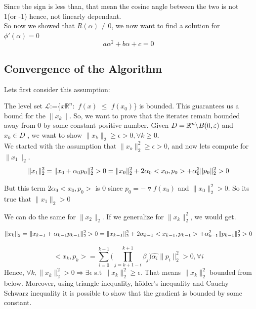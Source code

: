 \documentclass{article}
\numberwithin{equation}{section}
\begin{document}
Since the sign is less than, that mean the cosine angle between the two is not 1(or -1) hence, not linearly dependant.
\\
So now we showed that $R(\alpha) \neq 0 $, we now want to find a solution for $\phi ' (\alpha) = 0$ \\
 \begin{equation}
 a\alpha^2 + b\alpha + c = 0
\end{equation}
\subsection{Convergence of the Algorithm}

Lets first consider this assumption:

The level set $\mathcal{L}$:=\{$x$\in $\mathbb{R}^n:$ $f(x)$ $\leq$ $f(x_0)$\} is bounded. This guarantees us a bound for the $\|x_k\|$. So, we want to  prove that the iterates remain bounded away from 0 by some constant positive number. Given $D = \mathbb{R}^n \char`\\  B(0,\varepsilon)$ and $x_k \in D$ , we want to show $\|x_k\|_2 \geq \epsilon > 0, \forall k \geq 0$. \\

We started with the assumption that $\|x_o\|_2^2 \geq \epsilon > 0$, and now lets compute for $\|x_1\|_2$.
\begin{equation*}
\|x_1\|_2^2 =  \|x_0 + \alpha _0 p_0\|_2^2 > 0 \\
   = \|x_0\|_2^2 +2\alpha_0 <x_0,p_0>+ \alpha_0^2\|p_0\|_2^2   > 0 \\
\end{equation*}

But this term  $2\alpha_0 <x_0,p_0>$ is 0 since $p_0 = -\triangledown f(x_0)$  and $\|x_0\|_2^2 > 0$. So its true that $\|x_1\|_2 > 0$

We can do the same for $\|x_2\|_2$. If we generalize for $\|x_k\|_2^2$, we would get.

\begin{equation*}
\|x_k\|_2 =  \|x_{k-1} + \alpha _{k-1} p_{k-1}\|_2^2 > 0 \\
   = \|x_{k-1}\|_2^2 +2\alpha_{k-1} <x_{k-1},p_{k-1}>+ \alpha_{k-1}^2\|p_{k-1}\|_2^2   > 0 \\
\end{equation*}


\begin{equation}
<x_k,p_k> = \sum_{i=0}^{k-1} \big(\prod_{j=k+1-i}^{k+1}\beta_j\big) \hat{\alpha _i} \|p_i\|_2^2 > 0 , \forall i 
\end{equation}
Hence, $\forall k , \|x_k\|_2^2 > 0 \Rightarrow \exists \epsilon $ s.t $\|x_k\|_2^2 \geq \epsilon$. That means $\|x_k\|_2^2$ bounded from below. Moreover, using triangle inequality, hölder's inequality and Cauchy–Schwarz inequality it is possible to show that the gradient is bounded by some constant.
\end{document}
